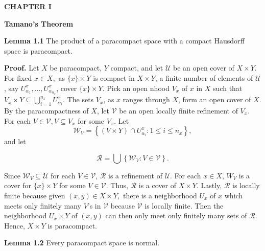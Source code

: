 \documentclass{article}
\begin{document}
\begin{center}


\textbf{CHAPTER I}

\vskip 15pt

\textbf{Tamano's Theorem}


\end{center}



\vskip 30pt


\textbf{Lemma 1.1} The product of a paracompact space with a compact Hausdorff space is paracompact. 

\vskip 5pt

\textbf{Proof.} Let $X$ be paracompact, $Y$ compact, and let $\mathcal{U}$ be an open cover of $X\times Y$. For fixed $x\in X,$ as $\{x\}\times Y$ is compact in $X\times Y$, a finite number of elements of $\mathcal{U}$, say $U_{\alpha_1}^x, \dots , U_{\alpha_{n_x}}^x$, cover $\{x\}\times Y$. Pick an open nhood $V_x$ of $x$ in $X$ such that $V_x\times Y\subseteq \bigcup_{i=1}^{n_x} U_{\alpha_i}^x.$ 
\vskip 10pt
The sets $V_x$, as $x$ ranges through $X$, form an open cover of $X$. By the paracompactness of $X$, let $\mathcal{V}$ be an open locally finite refinement of $V_x$. For each $V\in \mathcal{V}, V\subseteq V_x$ for some $V_x$. 
Let $$\mathcal{W}_V=\left\{(V\times Y)\cap U_{\alpha_i}^x: 1\leq i\leq n_x\right\},$$ and let 

$$\mathcal{R}=\bigcup \left\{\mathcal{W}_V: V\in \mathcal{V}\right\}.$$

\vskip 5pt

Since $\mathcal{W}_V\subseteq \mathcal{U}$ for each $V\in \mathcal{V}$, $\mathcal{R}$ is a refinement of $\mathcal{U}$. For each $x\in X$, $W_V$ is a cover for $\{x\}\times Y$ for some $V\in \mathcal{V}$. Thus, $\mathcal{R}$ is a cover of $X\times Y$. Lastly, $\mathcal{R}$ is locally finite because given $(x,y)\in X\times Y,$ there is a neighborhood $U_x$ of $x$ which meets only finitely many $V$'s in $\mathcal{V}$ because $\mathcal{V}$ is locally finite. Then the neighborhood $U_x\times Y$ of $(x,y)$ can then only meet only finitely many sets of $\mathcal{R}$. Hence, $X\times Y$ is paracompact.


\vskip 35pt


\textbf{Lemma 1.2}  Every paracompact space is normal. 

\vskip 10pt
\end{document}
